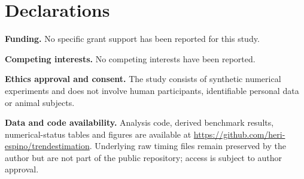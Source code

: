 \documentclass[pdflatex,sn-mathphys-ay]{sn-jnl}
\begin{document}
\section*{Declarations}
\noindent\textbf{Funding.} No specific grant support has been reported for this study.

\noindent\textbf{Competing interests.} No competing interests have been reported.

\noindent\textbf{Ethics approval and consent.} The study consists of synthetic numerical experiments and does not involve human participants, identifiable personal data or animal subjects.

\noindent\textbf{Data and code availability.} Analysis code, derived benchmark results, numerical-status tables and figures are available at \url{https://github.com/heri-espino/trendestimation}. Underlying raw timing files remain preserved by the author but are not part of the public repository; access is subject to author approval.


\end{document}
